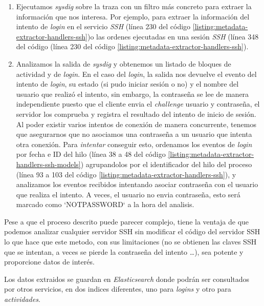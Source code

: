 \begin{enumerate}
    \item Ejecutamos \emph{sysdig} sobre la traza con un filtro más concreto para extraer la información que nos interesa. Por ejemplo, para extraer la información
    del intento de \emph{login} en el servicio \emph{SSH} (línea 230 del código \ref{listing:metadata-extractor-handlers-ssh})o las ordenes ejecutadas en una sesión \emph{SSH} (línea 348 del código (línea 230 del código \ref{listing:metadata-extractor-handlers-ssh}).
    \item Analizamos la salida de \emph{sysdig} y obtenemos un listado de bloques de actividad y de \emph{login}. En el caso del \emph{login}, la salida nos devuelve
    el evento del intento de \emph{login}, su estado (si pudo iniciar sesión o no) y el nombre del usuario que realizó el intento, sin embargo, la contraseña se lee de manera independiente puesto que el cliente 
    envia el \emph{challenge} usuario y contraseña, el servidor los comprueba y registra el resultado del intento de inicio de sesión. Al poder existir varios intentos de conexión de manera concurrente,
    tenemos que asegurarnos que no asociamos una contraseña a un usuario que intenta otra conexión. Para \emph{intentar} conseguir esto, ordenamos los eventos de \emph{login} por fecha e ID del hilo (línea 38 a 48 del código \ref{listing:metadata-extractor-handlers-ssh-models}) agrupandolos por el identificador del hilo del proceso (línea 93 a 103 del código \ref{listing:metadata-extractor-handlers-ssh}), 
    y analizamos los eventos recibidos intentando asociar contraseña con el usuario que realiza el intento. A veces, el usuario no envia contraseña, esto será marcado como `NOTPASSWORD` a la hora del analisis.
\end{enumerate}

Pese a que el proceso descrito puede parecer complejo, tiene la ventaja de que podemos analizar cualquier servidor SSH sin modificar el código del servidor SSH
lo que hace que este metodo, con sus limitaciones (no se obtienen las claves SSH que se intentan, a veces se pierde la contraseña del intento \ldots), sea potente y proporcione datos de interés.

Los datos extraidos se guardan en \emph{Elasticsearch} donde podrán ser consultados por otros servicios, en dos indices diferentes, uno para \emph{logins}
y otro para \emph{actividades}.

